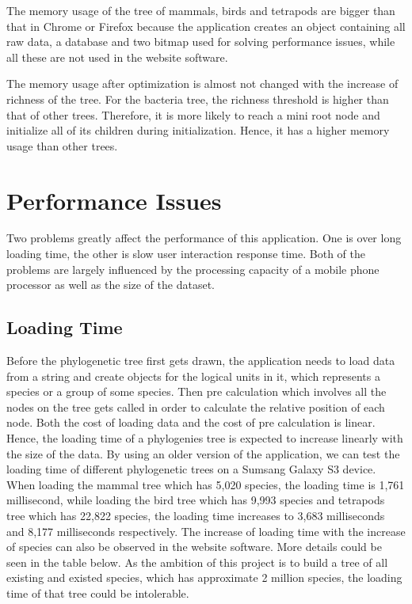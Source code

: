 \documentclass[MSc]{icldt}
\begin{document}
The memory usage of the tree of mammals, birds and tetrapods are bigger than that in Chrome or Firefox because the application creates an object containing all raw data, a database and two bitmap used for solving performance issues, while all these are not used in the website software.

The memory usage after optimization is almost not changed with the increase of richness of the tree. For the bacteria tree, the richness threshold is higher than that of other trees. Therefore, it is more likely to reach a mini root node and initialize all of its children during initialization. Hence, it has a higher memory usage than other trees.

\chapter{Performance Issues}

Two problems greatly affect the performance of this application. One is over long loading time, the other is slow user interaction response time. Both of the problems are largely influenced by the processing capacity of a mobile phone processor as well as the size of the dataset. 

\section{Loading Time}

Before the phylogenetic tree first gets drawn, the application needs to load data from a string and create objects for the logical units in it, which represents a species or a group of some species. Then pre calculation which involves all the nodes on the tree gets called in order to calculate the relative position of each node. Both the cost of loading data and the cost of pre calculation is linear. Hence, the loading time of a phylogenies tree is expected to increase linearly with the size of the data. By using an older version of the application, we can test the loading time of different phylogenetic trees on a Sumsang Galaxy S3 device. When loading the mammal tree which has 5,020 species, the loading time is 1,761 millisecond, while loading the bird tree which has 9,993 species and tetrapods tree which has 22,822 species, the loading time increases to 3,683 milliseconds and 8,177 milliseconds respectively. The increase of loading time with the increase of species can also be observed in the website software. More details could be seen in the table below. As the ambition of this project is to build a tree of all existing and existed species, which has approximate 2 million species, the loading time of that tree could be intolerable.
\end{document}
